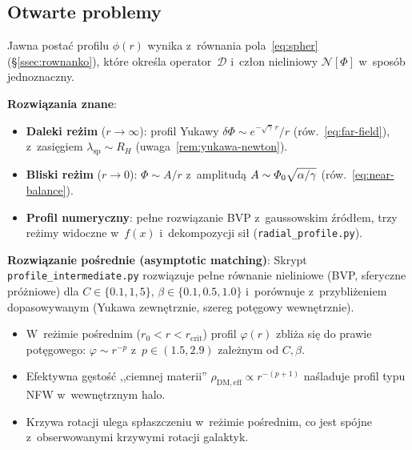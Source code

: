 \subsection{Otwarte problemy}\label{ssec:rezimy-problemy}

\begin{problem}\label{prob:profil}
Jawna posta\'c profilu $\phi(r)$ wynika z~r\'ownania
pola~\eqref{eq:spher} (\S\ref{ssec:rownanko}), kt\'ore
okre\'sla operator~$\mathcal{D}$ i~cz\l{}on nieliniowy
$\mathcal{N}[\Phi]$ w~spos\'ob jednoznaczny.

\textbf{Rozwi\k{a}zania znane}:
\begin{itemize}[nosep]
  \item \textbf{Daleki re\.zim} ($r \to \infty$):
    profil Yukawy $\delta\Phi \sim e^{-\sqrt\gamma\,r}/r$
    (r\'ow.~\ref{eq:far-field}), z~zasi\k{e}giem
    $\lambda_{\mathrm{sp}} \sim R_H$ (uwaga~\ref{rem:yukawa-newton}).
  \item \textbf{Bliski re\.zim} ($r \to 0$):
    $\Phi \sim A/r$ z~amplitud\k{a} $A \sim \varPhi_0\sqrt{\alpha/\gamma}$
    (r\'ow.~\ref{eq:near-balance}).
  \item \textbf{Profil numeryczny}: pe\l{}ne rozwi\k{a}zanie BVP
    z~gaussowskim \'zr\'od\l{}em, trzy re\.zimy widoczne w~$f(x)$
    i~dekompozycji si\l{} (\texttt{radial\_profile.py}).
\end{itemize}

\textbf{Rozwi\k{a}zanie po\'srednie (asymptotic matching)}:
Skrypt \texttt{profile\_intermediate.py} rozwi\k{a}zuje pe\l{}ne
r\'ownanie nieliniowe (BVP, sferyczne pr\'o\.zniowe) dla
$C \in \{0.1, 1, 5\}$, $\beta \in \{0.1, 0.5, 1.0\}$
i~por\'ownuje z~przybli\.zeniem dopasowywanym (Yukawa zewn\k{e}trznie,
szereg pot\k{e}gowy wewn\k{e}trznie).
\begin{itemize}[nosep]
  \item W~re\.zimie po\'srednim ($r_0 < r < r_{\mathrm{crit}}$)
    profil $\varphi(r)$ zbli\.za si\k{e} do prawie pot\k{e}gowego:
    $\varphi \sim r^{-p}$ z~$p \in (1.5, 2.9)$ zale\.znym od $C,\beta$.
  \item Efektywna g\k{e}sto\'s\'c ,,ciemnej materii''
    $\rho_{\mathrm{DM,eff}} \propto r^{-(p+1)}$ naśladuje profil
    typu NFW w~wewn\k{e}trznym halo.
  \item Krzywa rotacji ulega sp\l{}aszczeniu w~re\.zimie po\'srednim,
    co jest sp\'ojne z~obserwowanymi krzywymi rotacji galaktyk.
\end{itemize}
\end{problem}

